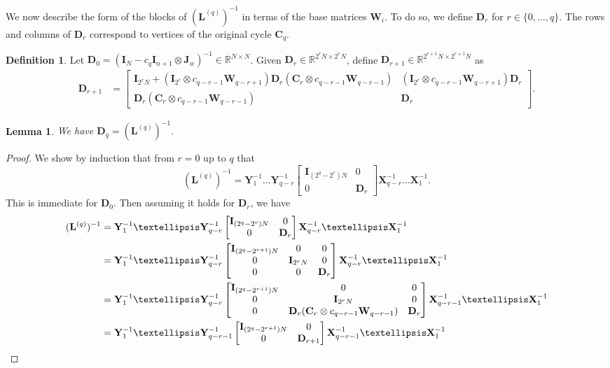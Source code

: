 \documentclass[11pt]{article}
\numberwithin{equation}{section}
\newtheorem{lemma}[theorem]{Lemma}
\theoremstyle{definition}
\newtheorem{definition}[theorem]{Definition}
\theoremstyle{plain}
\newcommand{\R}{\mathbb R}
\newcommand{\mX}{\mathbf{X}}
\newcommand{\mY}{\mathbf{Y}}
\newcommand{\mC}{\mathbf{C}}
\newcommand{\mD}{\mathbf{D}}
\newcommand{\mW}{\mathbf{W}}
\newcommand{\I}{\mathbf{I}}
\newcommand{\Jw}{\mathbf{J}_w}
\newcommand{\Lq}{\mathbf{L}^{(q)}}
\begin{document}
We now describe the form of the blocks of $(\Lq)^{-1}$ in terms of the base matrices $\mW_i$. To do so, we define $\mD_r$ for $r\in \{0,\ldots,q\}$. The rows and columns of $\mD_r$ correspond to vertices of the original cycle $\mC_{q}$. 
\begin{definition}\label{def:D}
Let $\mD_{0}=(\I_N-c_q\I_{n+1}\otimes \Jw)^{-1}\in \R^{N \times N}$. Given $\mD_{r} \in \R^{2^{r}N\times 2^{r}N}$, define $\mD_{r+1}\in\R^{2^{r+1}N\times 2^{r+1}N}$ as
\begin{align*}
    \mD_{r+1} &= \begin{bmatrix}\I_{2^{r}N}+(\I_{2^{r}}\otimes c_{q-r-1}\mW_{q-r+1})\mD_{r}(\mC_{r} \otimes c_{q-r-1}\mW_{q-r-1}) & (\I_{2^r}\otimes c_{q-r-1}\mW_{q-r+1})\mD_{r}\\ \mD_{r}(\mC_{r} \otimes c_{q-r-1}\mW_{q-r-1}) & \mD_{r}\end{bmatrix}.
\end{align*}

\end{definition}
%
\begin{lemma}\label{lem:Dzeroform}
We have $\mD_q=(\Lq)^{-1}.$
\end{lemma}
\begin{proof}
We show by induction that from $r=0$ up to $q$ that
\[(\Lq)^{-1}=\mY_1^{-1}\dots \mY_{q-r}^{-1}\begin{bmatrix}
 \I_{(2^q-2^{r})N} & 0\\ 0 & \mD_r\end{bmatrix}\mX_{q-r}^{-1}\dots\mX_1^{-1}.
\]
This is immediate for $\mD_0$. Then assuming it holds for $\mD_r$, 
we have %
\begin{align*}
    (\Lq)^{-1} &=\mY_1^{-1}\dots \mY_{q-r}^{-1}
    \begin{bmatrix}\I_{(2^q-2^{r})N} & 0\\ 0 & \mD_r\end{bmatrix}
    \mX_{q-r}^{-1}\dots\mX_1^{-1}\\
    &= \mY_1^{-1}\dots \mY_{q-r}^{-1}\begin{bmatrix}
 \I_{(2^q-2^{r+1})N} & 0 & 0\\ 0 & \I_{2^{r}N} & 0\\ 0 & 0 & \mD_r\end{bmatrix}\mX_{q-r}^{-1}\dots\mX_1^{-1}\\
 &= \mY_1^{-1}\dots \mY_{q-r}^{-1}\begin{bmatrix}
 \I_{(2^q-2^{r+1})N} & 0 & 0\\ 0 & \I_{2^{r}N} & 0\\ 0 & \mD_{r}(\mC_{r}\otimes c_{q-r-1}\mW_{q-r-1}) & \mD_r\end{bmatrix}\mX_{q-r-1}^{-1}\dots\mX_1^{-1}\\
 &= \mY_1^{-1}\dots \mY_{q-r-1}^{-1}\begin{bmatrix}
 \I_{(2^q-2^{r+1})N} & 0 \\ 0 & \mD_{r+1} \end{bmatrix}\mX_{q-r-1}^{-1}\dots\mX_1^{-1}\qedhere
\end{align*}
\end{proof}
\end{document}
